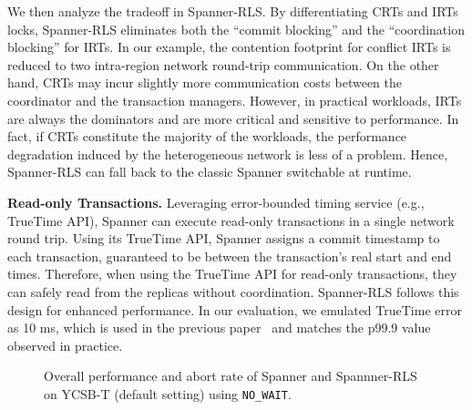 We then analyze the tradeoff in Spanner-RLS. By differentiating CRTs and IRTs locks, Spanner-RLS eliminates both the ``commit blocking'' and the ``coordination blocking'' for IRTs. In our example, the contention footprint for conflict IRTs is reduced to two intra-region network round-trip communication. On the other hand, CRTs may incur slightly more communication costs between the coordinator and the transaction managers. However, in practical workloads, IRTs are always the dominators and are more critical and sensitive to performance. In fact, if CRTs constitute the majority of the workloads, the performance degradation induced by the heterogeneous network is less of a problem. Hence, Spanner-RLS can fall back to the classic Spanner switchable at runtime.



\noindent\textbf{Read-only Transactions.} Leveraging error-bounded timing service (e.g., TrueTime API), Spanner can execute read-only transactions in a single network round trip. Using its TrueTime API, Spanner assigns a commit timestamp to each transaction, guaranteed to be between the transaction’s real start and end times. Therefore, when using the TrueTime API for read-only transactions, they can safely read from the replicas without coordination. Spanner-RLS follows this design for enhanced performance. In our evaluation, we emulated TrueTime error as 10 ms, which is used in the previous paper~\cite{rss} and matches the p99.9 value observed in practice.


\begin{figure}[t]
	\centering
	\hfill 
	\caption{Overall performance and abort rate of Spanner and Spannner-RLS on YCSB-T (default setting) using \texttt{NO\_WAIT}.}\label{fig:eval:spanner:overall:abort}
\end{figure}

